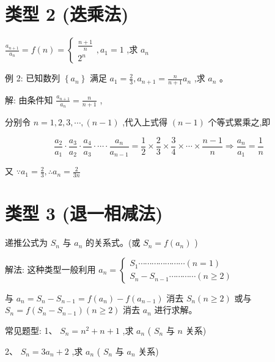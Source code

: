 \documentclass[10pt,cn]{elegantbook}
\begin{document}
\section{类型 2 (迭乘法)} \(\frac{{a}_{n + 1}}{{a}_{n}} = f\left( n\right) = \left\{ \begin{array}{l} \frac{n + 1}{n} \\ {2}^{n} \end{array}\right. ,{a}_{1} = 1\) ,求 \({a}_{n}\)

例 2: 已知数列 \(\left\{ {a}_{n}\right\}\) 满足 \({a}_{1} = \frac{2}{3},{a}_{n + 1} = \frac{n}{n + 1}{a}_{n}\) ,求 \({a}_{n}\) 。

解: 由条件知 \(\frac{{a}_{n + 1}}{{a}_{n}} = \frac{n}{n + 1}\) ,

分别令 \(n = 1,2,3,\cdots ,\left( {n - 1}\right)\) ,代入上式得 \(\left( {n - 1}\right)\) 个等式累乘之,即

\[
\frac{{a}_{2}}{{a}_{1}} \cdot \frac{{a}_{3}}{{a}_{2}} \cdot \frac{{a}_{4}}{{a}_{3}} \cdot \cdots \cdot \frac{{a}_{n}}{{a}_{n - 1}} = \frac{1}{2} \times \frac{2}{3} \times \frac{3}{4} \times \cdots \times \frac{n - 1}{n} \Rightarrow \frac{{a}_{n}}{{a}_{1}} = \frac{1}{n}
\]



又 \(\because {a}_{1} = \frac{2}{3},\therefore {a}_{n} = \frac{2}{3n}\)

\section{类型 3 (退一相减法)} 递推公式为 \({S}_{n}\) 与 \({a}_{n}\) 的关系式。(或 \({S}_{n} = f\left( {a}_{n}\right)\) )

解法: 这种类型一般利用 \({a}_{n} = \left\{ \begin{array}{l} {S}_{1}\cdots \cdots \cdots \cdots \cdots \cdots \cdots \left( {n = 1}\right) \\ {S}_{n} - {S}_{n - 1}\cdots \cdots \cdots \cdots \left( {n \geq 2}\right) \end{array}\right.\)

与 \({a}_{n} = {S}_{n} - {S}_{n - 1} = f\left( {a}_{n}\right) - f\left( {a}_{n - 1}\right)\) 消去 \({S}_{n}\left( {n \geq 2}\right)\) 或与 \({S}_{n} = f\left( {{S}_{n} - {S}_{n - 1}}\right) \left( {n \geq 2}\right)\) 消去 \({a}_{n}\) 进行求解。

常见题型: 1、 \({S}_{n} = {n}^{2} + n + 1\) ,求 \({a}_{n}\) ( \({S}_{n}\) 与 \(n\) 关系)

2、 \({S}_{n} = 3{a}_{n} + 2\) ,求 \({a}_{n}\) ( \({S}_{n}\) 与 \({a}_{n}\) 关系)
\end{document}
